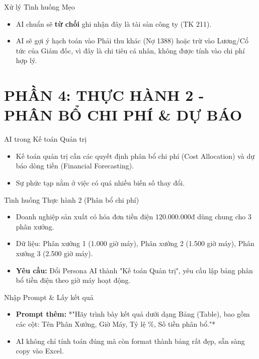 \documentclass[aspectratio=169]{beamer}
\begin{document}
\begin{frame}{Xử lý Tình huống Mẹo}
    \begin{itemize}
        \item AI chuẩn sẽ \textbf{từ chối} ghi nhận đây là tài sản công ty (TK 211).
        \item AI sẽ gợi ý hạch toán vào Phải thu khác (Nợ 1388) hoặc trừ vào Lương/Cổ tức của Giám đốc, vì đây là chi tiêu cá nhân, không được tính vào chi phí hợp lý.
    \end{itemize}
\end{frame}


\section{PHẦN 4: THỰC HÀNH 2 - PHÂN BỔ CHI PHÍ \& DỰ BÁO}


\begin{frame}{AI trong Kế toán Quản trị}
    \begin{itemize}
        \item Kế toán quản trị cần các quyết định phân bổ chi phí (Cost Allocation) và dự báo dòng tiền (Financial Forecasting).
        \item Sự phức tạp nằm ở việc có quá nhiều biến số thay đổi.
    \end{itemize}
\end{frame}


\begin{frame}{Tình huống Thực hành 2 (Phân bổ chi phí)}
    \begin{itemize}
        \item Doanh nghiệp sản xuất có hóa đơn tiền điện 120.000.000đ dùng chung cho 3 phân xưởng.
        \item Dữ liệu: Phân xưởng 1 (1.000 giờ máy), Phân xưởng 2 (1.500 giờ máy), Phân xưởng 3 (2.500 giờ máy).
        \item \textbf{Yêu cầu:} Đổi Persona AI thành "Kế toán Quản trị", yêu cầu lập bảng phân bổ tiền điện theo giờ máy hoạt động.
    \end{itemize}
\end{frame}


\begin{frame}{Nhập Prompt \& Lấy kết quả}
    \begin{itemize}
        \item \textbf{Prompt thêm:} *"Hãy trình bày kết quả dưới dạng Bảng (Table), bao gồm các cột: Tên Phân Xưởng, Giờ Máy, Tỷ lệ \%, Số tiền phân bổ."*
        \item AI không chỉ tính toán đúng mà còn format thành bảng rất đẹp, sẵn sàng copy vào Excel.
    \end{itemize}
\end{frame}
\end{document}
